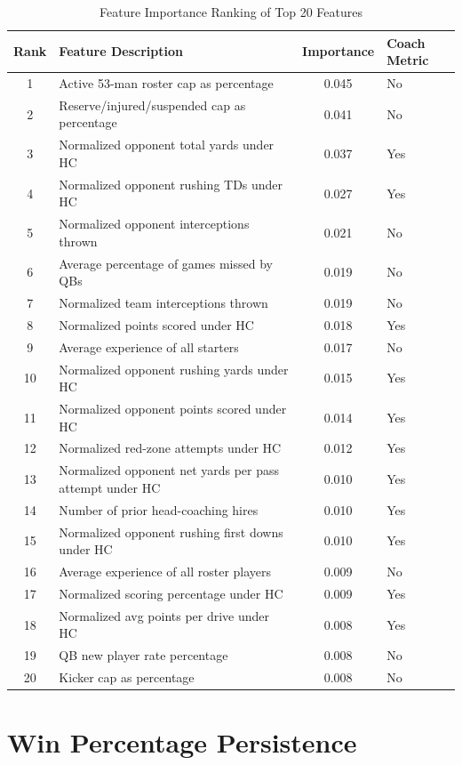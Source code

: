 \documentclass[USenglish]{article}
\theoremstyle{dgthm}
\theoremstyle{dgdef}
\begin{document}
\begin{table}[!ht]
\caption{Feature Importance Ranking of Top 20 Features}
\label{tab:feature_importance}
\small
\begin{tabular}{clcl}
\toprule
Rank & Feature Description & Importance & Coach Metric \\
\midrule
1 & Active 53-man roster cap as percentage & 0.045 & No \\
2 & Reserve/injured/suspended cap as percentage & 0.041 & No \\
3 & Normalized opponent total yards under HC & 0.037 & Yes \\
4 & Normalized opponent rushing TDs under HC & 0.027 & Yes \\
5 & Normalized opponent interceptions thrown & 0.021 & No \\
6 & Average percentage of games missed by QBs & 0.019 & No \\
7 & Normalized team interceptions thrown & 0.019 & No \\
8 & Normalized points scored under HC & 0.018 & Yes \\
9 & Average experience of all starters & 0.017 & No \\
10 & Normalized opponent rushing yards under HC & 0.015 & Yes \\
11 & Normalized opponent points scored under HC & 0.014 & Yes \\
12 & Normalized red-zone attempts under HC & 0.012 & Yes \\
13 & Normalized opponent net yards per pass attempt under HC & 0.010 & Yes \\
14 & Number of prior head-coaching hires & 0.010 & Yes \\
15 & Normalized opponent rushing first downs under HC & 0.010 & Yes \\
16 & Average experience of all roster players & 0.009 & No \\
17 & Normalized scoring percentage under HC & 0.009 & Yes \\
18 & Normalized avg points per drive under HC & 0.008 & Yes \\
19 & QB new player rate percentage & 0.008 & No \\
20 & Kicker cap as percentage & 0.008 & No \\
\bottomrule
\end{tabular}
\end{table}

\clearpage

\section{Win Percentage Persistence}
\end{document}
